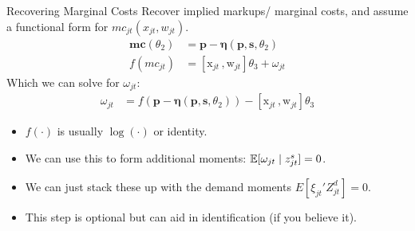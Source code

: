 \begin{frame}{Recovering Marginal Costs }
Recover implied markups/ marginal costs, and assume a functional form for $mc_{jt}(x_{jt},w_{jt})$.
\begin{align*}
\mathbf{mc}(\theta_2)&= \mathbf{p}- \boldsymbol{\eta}(\mathbf{p},\mathbf{s},\theta_2)\\
f(mc_{jt}) &= [\textrm{x}_{jt} \,, \textrm{w}_{jt}] \theta_3 + \omega_{jt}
\end{align*}
Which we can solve for $\omega_{jt}$:
\begin{align*}
\omega_{jt} &=  f(\mathbf{p}- \boldsymbol{\eta}(\mathbf{p},\mathbf{s},\theta_2) ) -[\textrm{x}_{jt} \,, \textrm{w}_{jt}] \theta_3 
\end{align*}
\begin{itemize}
\item $f(\cdot)$ is usually $\log(\cdot)$ or identity.
\item We can use this to form additional moments: $\mathbb{E}[\omega_{jt} \mid  z_{jt}^{s}]=0$.
\item We can just stack these up with the demand moments $E[\xi_{jt}' Z_{jt}^d]=0$.
\item This step is optional but can aid in identification (if you believe it).
\end{itemize}
\end{frame}






